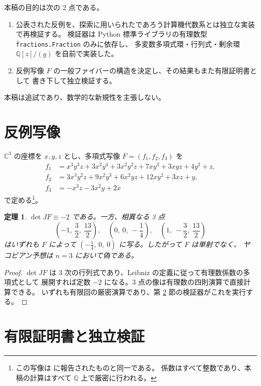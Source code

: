 \documentclass[paper=a4,fontsize=10.5pt,jafontsize=10.5pt]{jlreq}
\theoremstyle{plain}
\newtheorem{theorem}{定理}[section]
\theoremstyle{definition}
\begin{document}
本稿の目的は次の 2 点である。

\begin{enumerate}
\item 公表された反例を、探索に用いられたであろう計算機代数系とは独立な実装で再検証する。
  検証器は Python 標準ライブラリの有理数型 \texttt{fractions.Fraction} のみに依存し、
  多変数多項式環・行列式・剰余環 $\mathbb{Q}[z]/(g)$ を自前で実装した。
\item 反例写像 $F$ の一般ファイバーの構造を決定し、その結果もまた有限証明書として
  書き下して独立検証する。
\end{enumerate}

本稿は追試であり、数学的な新規性を主張しない。

\section{反例写像}

$\mathbb{C}^3$ の座標を $x, y, z$ とし、多項式写像 $F = (f_1, f_2, f_3)$ を
\begin{align}
  f_1 &= x^{3}y^{3}z + 3x^{2}y^{4} + 3x^{2}y^{2}z + 7xy^{3} + 3xyz + 4y^{2} + z, \\
  f_2 &= 3x^{3}y^{2}z + 9x^{2}y^{3} + 6x^{2}yz + 12xy^{2} + 3xz + y, \\
  f_3 &= - x^{3}z - 3x^{2}y + 2x
\end{align}
で定める\footnote{この写像は \cite{wiki-jacobian} に報告されたものと同一である。
係数はすべて整数であり、本稿の計算はすべて $\mathbb{Q}$ 上で厳密に行われる。}。

\begin{theorem}\label{thm:main}
$\det JF \equiv -2$ である。一方、相異なる 3 点
\[
  (-1,\ \frac{3}{2},\ \frac{13}{2}),\quad (0,\ 0,\ -\frac{1}{4}),\quad (1,\ -\frac{3}{2},\ \frac{13}{2})
\]
はいずれも $F$ によって $(-\frac{1}{4},\ 0,\ 0)$ に写る。したがって $F$ は単射でなく、
ヤコビアン予想は $n = 3$ において偽である。
\end{theorem}

\begin{proof}
$\det JF$ は 3 次の行列式であり、Leibniz の定義に従って有理数係数の多項式として
展開すれば定数 $-2$ になる。3 点の像は有理数の四則演算で直接計算できる。
いずれも有限回の厳密演算であり、第 \ref{sec:cert} 節の検証器がこれを実行する。
\end{proof}

\section{有限証明書と独立検証}\label{sec:cert}
\end{document}
